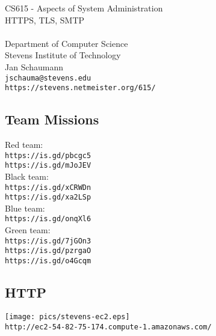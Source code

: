 \documentclass[xga]{xdvislides}
\begin{document}
\setfontphv

\lhead{\slidetitle}                               %
\cfoot{\relax}                               %
\rfoot{\Gray{\today}}

\newcommand{\smallish}{\fontsize{16}{16}\selectfont}

\vspace*{\fill}
\begin{center}
	\Hugesize
		CS615 - Aspects of System Administration\\ [1em]
		HTTPS, TLS, SMTP\\ [1em]
	\hspace*{5mm}\blueline\\ [1em]
	\Normalsize
		Department of Computer Science\\
		Stevens Institute of Technology\\
		Jan Schaumann\\
		\verb+jschauma@stevens.edu+\\
		\verb+https://stevens.netmeister.org/615/+
\end{center}
\vspace*{\fill}

\subsection{Team Missions}
Red team: \\
\verb+https://is.gd/pbcgc5+ \\
\verb+https://is.gd/mJoJEV+ \\

Black team: \\
\verb+https://is.gd/xCRWDn+ \\
\verb+https://is.gd/xa2LSp+ \\

Blue team: \\
\verb+https://is.gd/onqXl6+ \\

Green team: \\
\verb+https://is.gd/7jGOn3+ \\
\verb+https://is.gd/pzrgaO+ \\
\verb+https://is.gd/o4Gcqm+

\subsection{HTTP}
\begin{center}
	\texttt{[image: pics/stevens-ec2.eps]} \\
	\verb+http://ec2-54-82-75-174.compute-1.amazonaws.com/+
\end{center}
\end{document}
